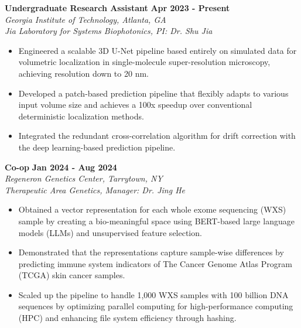 \documentclass[letterpaper, 11pt]{article}
\newcommand{\subsectionvspace}{\vspace{6pt}}
\begin{document}
    \subsectionvspace

    \textbf{Undergraduate Research Assistant} \hfill 
    \textbf{Apr 2023 - Present} \\
    \textit{Georgia Institute of Technology, Atlanta, GA} \\
    \textit{Jia Laboratory for Systems Biophotonics, PI: Dr. Shu Jia}
    \begin{itemize}
        \item Engineered a scalable 3D U-Net pipeline based entirely on simulated data for volumetric localization in single-molecule super-resolution microscopy, achieving resolution down to 20 nm.
        \item Developed a patch-based prediction pipeline that flexibly adapts to various input volume size and achieves a 100x speedup over conventional deterministic localization methods.
        \item Integrated the redundant cross-correlation algorithm for drift correction with the deep learning-based prediction pipeline.
    \end{itemize}

    \subsectionvspace

    \textbf{Co-op} \hfill 
    \textbf{Jan 2024 - Aug 2024} \\
    \textit{Regeneron Genetics Center, Tarrytown, NY} \\
    \textit{Therapeutic Area Genetics, Manager: Dr. Jing He}
    \begin{itemize}
        \item Obtained a vector representation for each whole exome sequencing (WXS) sample by creating a bio-meaningful space using BERT-based large language models (LLMs) and unsupervised feature selection.
        \item Demonstrated that the representations capture sample-wise differences by predicting immune system indicators of The Cancer Genome Atlas Program (TCGA) skin cancer samples.
        \item Scaled up the pipeline to handle 1,000 WXS samples with 100 billion DNA sequences by optimizing parallel computing for high-performance computing (HPC) and enhancing file system efficiency through hashing.
    \end{itemize}

    \subsectionvspace
\end{document}
